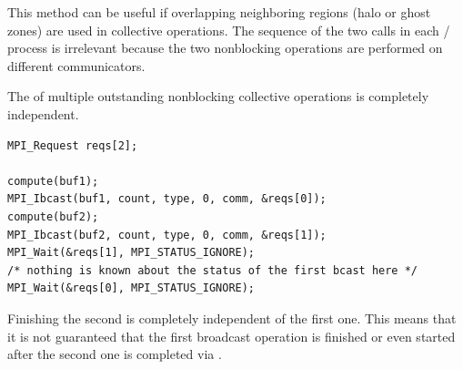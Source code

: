 \begin{users}
This method can be useful if overlapping neighboring regions (halo
or ghost zones) are used in collective operations. The sequence of the
two calls in each \MPI/ process is irrelevant because the two nonblocking
operations are performed on different communicators.
\end{users}

\begin{example}
\label{coll-nbexN8}
%
%
The 
of multiple outstanding nonblocking collective operations
is completely independent.

\begin{lstlisting}[language={[MPI]C}]
MPI_Request reqs[2];

compute(buf1);
MPI_Ibcast(buf1, count, type, 0, comm, &reqs[0]);
compute(buf2);
MPI_Ibcast(buf2, count, type, 0, comm, &reqs[1]);
MPI_Wait(&reqs[1], MPI_STATUS_IGNORE);
/* nothing is known about the status of the first bcast here */
MPI_Wait(&reqs[0], MPI_STATUS_IGNORE);
\end{lstlisting}

Finishing the second  is completely independent of
the first one. This means that it is not guaranteed that the first
broadcast operation is finished or even started after the second one is
completed via .
\end{example}


